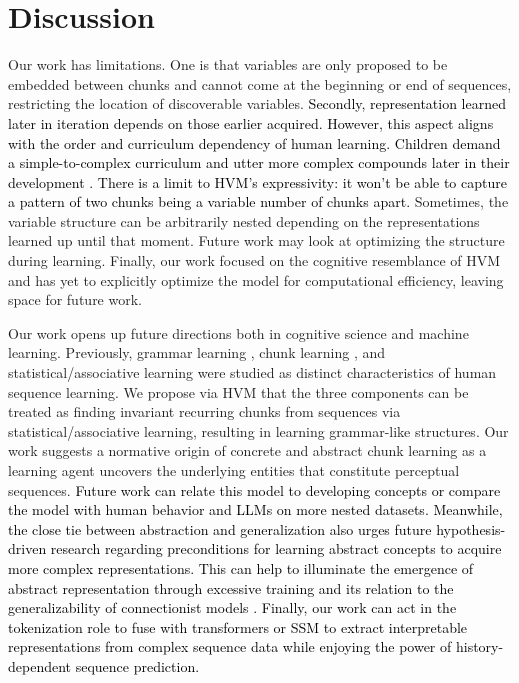 \documentclass{article} %
\theoremstyle{remark}
\begin{document}
\section{Discussion}
Our work has limitations. One is that variables are only proposed to be embedded between chunks and cannot come at the beginning or end of sequences, restricting the location of discoverable variables. 
\textcolor{black}{Secondly, representation learned later in iteration depends on those earlier acquired. However, this aspect aligns with the order and curriculum dependency of human learning. Children demand a simple-to-complex curriculum and utter more complex compounds later in their development \citep{Friedmann2021,Snow1972,Fernald1989}. There is a limit to HVM's expressivity: it won't be able to capture a pattern of two chunks being a variable number of chunks apart.} 
Sometimes, the variable structure can be arbitrarily nested depending on the representations learned up until that moment. Future work may look at optimizing the structure during learning. Finally, our work focused on the cognitive resemblance of HVM and has yet to explicitly optimize the model for computational efficiency, leaving space for future work. 

Our work opens up future directions both in cognitive science and machine learning. Previously, grammar learning \citep{CHOMSKY201333}, chunk learning \citep{Gobet2001}, and statistical/associative learning \citep{SAFFRAN199927} were studied as distinct characteristics of human sequence learning. We propose via HVM that the three components can be treated as finding invariant recurring chunks from sequences via statistical/associative learning, resulting in learning grammar-like structures. Our work suggests a normative origin of concrete and abstract chunk learning as a learning agent uncovers the underlying entities that constitute perceptual sequences. \textcolor{black}{Future work can relate this model to developing concepts or compare the model with human behavior and LLMs on more nested datasets.} 
\textcolor{black}{Meanwhile, the close tie between abstraction and generalization also urges future hypothesis-driven research regarding preconditions for learning abstract concepts to acquire more complex representations. This can help to illuminate the emergence of abstract representation through excessive training and its relation to the generalizability of connectionist models \citep{power2022grokking, miller2024grokking}. Finally, our work can act in the tokenization role to fuse with transformers or SSM to extract interpretable representations from complex sequence data while enjoying the power of history-dependent sequence prediction.}
\end{document}
